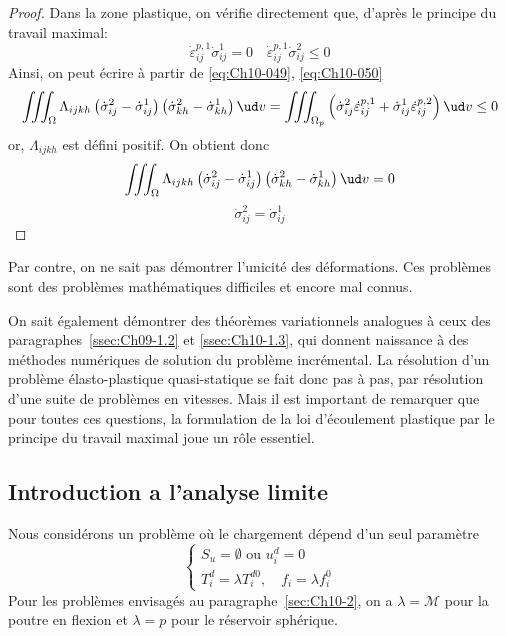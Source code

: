 \begin{proof}
    Dans la zone plastique, on vérifie directement que, d'après le principe du travail maximal: 
    \begin{equation}
        \dot{\varepsilon}_{ij}^{p,1} \dot{\sigma}_{ij}^1 = 0 \quad \dot{\varepsilon}_{ij}^{p,1} \dot{\sigma}_{ij}^2 \leq 0
        \label{eq:Ch10-050}
    \end{equation}
    Ainsi, on peut écrire à partir de \eqref{eq:Ch10-049}, \eqref{eq:Ch10-050}
    \begin{equation}
        \iiint_{\Omega} \Lambda_{ijkh} \left( \dot{\sigma}_{ij}^2 - \dot{\sigma}_{ij}^1 \right) \left( \dot{\sigma}_{kh}^2 - \dot{\sigma}_{kh}^1 \right) \ud v = \iiint_{\Omega_p} \left( \dot{\sigma}_{ij}^2 \dot{\varepsilon}_{ij}^{p,1} + \dot{\sigma}_{ij}^1 \dot{\varepsilon}_{ij}^{p,2} \right) \ud v \leq 0
        \label{eq:Ch10-051}
    \end{equation}
    or, $\Lambda_{ijkh}$ est défini positif.
    On obtient donc
    \begin{equation}
        \iiint_{\Omega} \Lambda_{ijkh} \left( \dot{\sigma}_{ij}^2 - \dot{\sigma}_{ij}^1 \right) \left( \dot{\sigma}_{kh}^2 - \dot{\sigma}_{kh}^1 \right) \ud v = 0
        \label{eq:Ch10-052}
    \end{equation}
    \begin{equation}
        \dot{\sigma}_{ij}^2 = \dot{\sigma}_{ij}^1
        \label{eq:Ch10-053}
    \end{equation}
\end{proof}

Par contre, on ne sait pas démontrer l'unicité des déformations. 
Ces problèmes sont des problèmes mathématiques difficiles et encore mal connus.

On sait également démontrer des théorèmes variationnels analogues à ceux des paragraphes~\ref{ssec:Ch09-1.2} et \ref{ssec:Ch10-1.3}, qui donnent naissance à des méthodes numériques de solution du problème incrémental.
La résolution d'un problème élasto-plastique quasi-statique se fait donc pas à pas, par résolution d'une suite de problèmes en vitesses.
Mais il est important de remarquer que pour toutes ces questions, la formulation de la loi d'écoulement plastique par le principe du travail maximal joue un rôle essentiel. 

\subsection{Introduction a l'analyse limite} \label{ssec:Ch10-3.2}
Nous considérons un problème où le chargement dépend d'un seul paramètre 
\begin{equation}
    \left\{
    \begin{aligned}
        S_u = \emptyset \text{ ou } u_i^d = 0 \\
        T_i^d = \lambda T_i^{d0}, \quad f_i = \lambda f_i^0
    \end{aligned}
    \right.
    \label{eq:Ch10-054}
\end{equation}
Pour les problèmes envisagés au paragraphe~\ref{sec:Ch10-2}, on  a $\lambda = \mathcal{M}$ pour la poutre en flexion et $\lambda=p$ pour le réservoir sphérique.  

